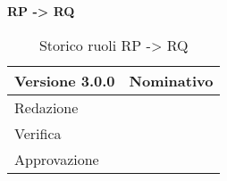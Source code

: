 \textbf{RP -> RQ}
\label{tabVers3}
\begin{table}[h]
	\begin{tabular}{p{} p{}}
		\toprule \textbf{Versione 3.0.0}	&	\textbf{Nominativo}\\
		\midrule Redazione	& \PM\\
		\midrule Verifica &	\TP\\
		\midrule Approvazione	&	\FM\\
		\bottomrule
	\end{tabular}
	\caption{Storico ruoli RP -> RQ}
\end{table}